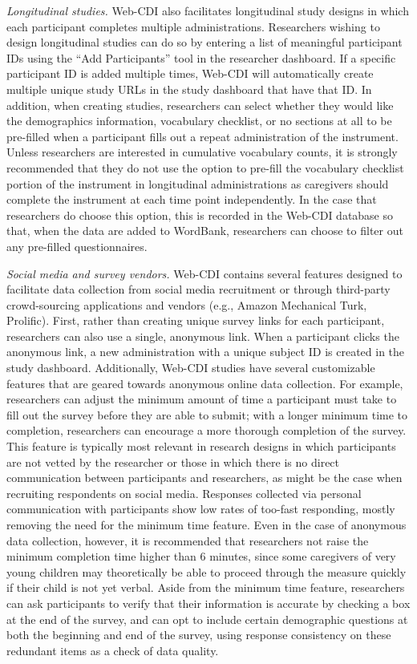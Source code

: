 \documentclass[
  english,
  ,man,floatsintext]{apa6}
\begin{document}
\emph{Longitudinal studies.} Web-CDI also facilitates longitudinal study designs in which each participant completes multiple administrations. Researchers wishing to design longitudinal studies can do so by entering a list of meaningful participant IDs using the ``Add Participants'' tool in the researcher dashboard. If a specific participant ID is added multiple times, Web-CDI will automatically create multiple unique study URLs in the study dashboard that have that ID. In addition, when creating studies, researchers can select whether they would like the demographics information, vocabulary checklist, or no sections at all to be pre-filled when a participant fills out a repeat administration of the instrument. Unless researchers are interested in cumulative vocabulary counts, it is strongly recommended that they do not use the option to pre-fill the vocabulary checklist portion of the instrument in longitudinal administrations as caregivers should complete the instrument at each time point independently. In the case that researchers do choose this option, this is recorded in the Web-CDI database so that, when the data are added to WordBank, researchers can choose to filter out any pre-filled questionnaires.

\emph{Social media and survey vendors.} Web-CDI contains several features designed to facilitate data collection from social media recruitment or through third-party crowd-sourcing applications and vendors (e.g., Amazon Mechanical Turk, Prolific). First, rather than creating unique survey links for each participant, researchers can also use a single, anonymous link. When a participant clicks the anonymous link, a new administration with a unique subject ID is created in the study dashboard. Additionally, Web-CDI studies have several customizable features that are geared towards anonymous online data collection. For example, researchers can adjust the minimum amount of time a participant must take to fill out the survey before they are able to submit; with a longer minimum time to completion, researchers can encourage a more thorough completion of the survey. This feature is typically most relevant in research designs in which participants are not vetted by the researcher or those in which there is no direct communication between participants and researchers, as might be the case when recruiting respondents on social media. Responses collected via personal communication with participants show low rates of too-fast responding, mostly removing the need for the minimum time feature. Even in the case of anonymous data collection, however, it is recommended that researchers not raise the minimum completion time higher than 6 minutes, since some caregivers of very young children may theoretically be able to proceed through the measure quickly if their child is not yet verbal. Aside from the minimum time feature, researchers can ask participants to verify that their information is accurate by checking a box at the end of the survey, and can opt to include certain demographic questions at both the beginning and end of the survey, using response consistency on these redundant items as a check of data quality.
\end{document}
